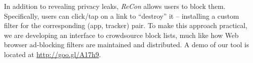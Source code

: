 In addition to revealing privacy leaks, \emph{ReCon} allows users to block them. Specifically, users can 
click/tap on a link to ``destroy'' it -- installing a custom 
filter for the corresponding (app, tracker) pair. To make this approach practical, we are developing 
an interface to crowdsource block lists, much like how Web browser ad-blocking filters are maintained 
and distributed. A demo of our tool is located at \url{http://goo.gl/A17h9}. 








